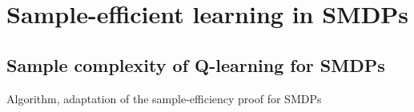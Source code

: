 \chapter{Sample-efficient learning in SMDPs}

\label{Chapter4}



\section{Sample complexity of Q-learning for SMDPs}

Algorithm, adaptation of the sample-efficiency proof for SMDPs

